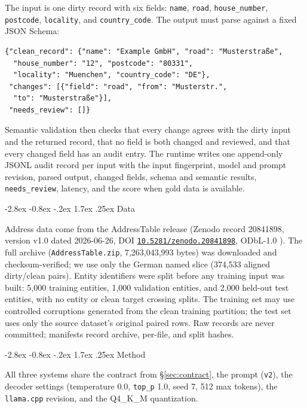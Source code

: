 \documentclass[11pt]{article}
\makeatletter
\newcommand{\doiref}[1]{\href{https://doi.org/#1}{\texttt{#1}}}
\renewcommand\section{\@startsection{section}{1}{\z@}%
  {-2.8ex \@plus -0.8ex \@minus -.2ex}%
  {1.7ex \@plus .25ex}%
  {\normalfont\Large\bfseries}}
\makeatother
\begin{document}
The input is one dirty record with six fields: \texttt{name},
\texttt{road}, \texttt{house\_number}, \texttt{postcode},
\texttt{locality}, and \texttt{country\_code}. The output must parse
against a fixed JSON Schema:
\begin{lstlisting}
{"clean_record": {"name": "Example GmbH", "road": "Musterstraße",
  "house_number": "12", "postcode": "80331",
  "locality": "Muenchen", "country_code": "DE"},
 "changes": [{"field": "road", "from": "Musterstr.",
  "to": "Musterstraße"}],
 "needs_review": []}
\end{lstlisting}
Semantic validation then checks that every change agrees with the
dirty input and the returned record, that no field is both changed and
reviewed, and that every changed field has an audit entry. The runtime
writes one append-only JSONL audit record per input with the input
fingerprint, model and prompt revision, parsed output, changed fields,
schema and semantic results, \texttt{needs\_review}, latency, and the
score when gold data is available.

\section{Data}
\label{sec:data}

Address data come from the AddressTable release (Zenodo record
20841898, version v1.0 dated 2026-06-26, DOI
\doiref{10.5281/zenodo.20841898}, ODbL-1.0 \cite{addressdoi, odbl}).
The full archive (\texttt{AddressTable.zip}, 7,263,043,993 bytes) was
downloaded and checksum-verified; we use only the German named slice
(374,533 aligned dirty/clean pairs). Entity identifiers were split
before any training input was built: 5,000 training entities, 1,000
validation entities, and 2,000 held-out test entities, with no entity
or clean target crossing splits. The training set may use controlled
corruptions generated from the clean training partition; the test set
uses only the source dataset's original paired rows. Raw records are
never committed; manifests record archive, per-file, and split hashes.

\section{Method}
\label{sec:method}

All three systems share the contract from \S\ref{sec:contract}, the
prompt (\texttt{v2}), the decoder settings (temperature 0.0,
\texttt{top\_p} 1.0, seed 7, 512 max tokens), the \texttt{llama.cpp}
revision, and the Q4\_K\_M quantization.
\end{document}
